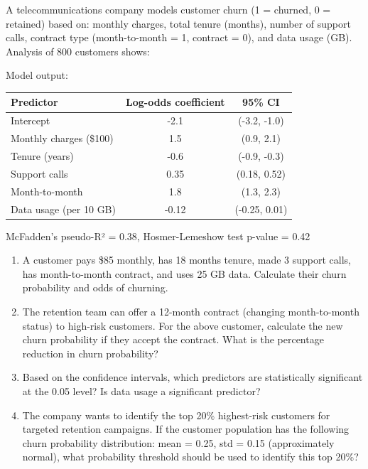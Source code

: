 \documentclass[12pt]{article}
\begin{document}
A telecommunications company models customer churn (1 = churned, 0 = retained) based on: monthly charges, total tenure (months), number of support calls, contract type (month-to-month = 1, contract = 0), and data usage (GB). Analysis of 800 customers shows:

Model output:
\begin{center}
\begin{tabular}{lcc}
\toprule
Predictor & Log-odds coefficient & 95\% CI \\
\midrule
Intercept & -2.1 & (-3.2, -1.0) \\
Monthly charges (\$100) & 1.5 & (0.9, 2.1) \\
Tenure (years) & -0.6 & (-0.9, -0.3) \\
Support calls & 0.35 & (0.18, 0.52) \\
Month-to-month & 1.8 & (1.3, 2.3) \\
Data usage (per 10 GB) & -0.12 & (-0.25, 0.01) \\
\bottomrule
\end{tabular}
\end{center}

McFadden's pseudo-R²  = 0.38, Hosmer-Lemeshow test p-value = 0.42

\begin{enumerate}[label=(\alph*)]
\item A customer pays \$85 monthly, has 18 months tenure, made 3 support calls, has month-to-month contract, and uses 25 GB data. Calculate their churn probability and odds of churning.

\item The retention team can offer a 12-month contract (changing month-to-month status) to high-risk customers. For the above customer, calculate the new churn probability if they accept the contract. What is the percentage reduction in churn probability?

\item Based on the confidence intervals, which predictors are statistically significant at the 0.05 level? Is data usage a significant predictor?

\item The company wants to identify the top 20\% highest-risk customers for targeted retention campaigns. If the customer population has the following churn probability distribution: mean = 0.25, std = 0.15 (approximately normal), what probability threshold should be used to identify this top 20\%?
\end{enumerate}
\end{document}
